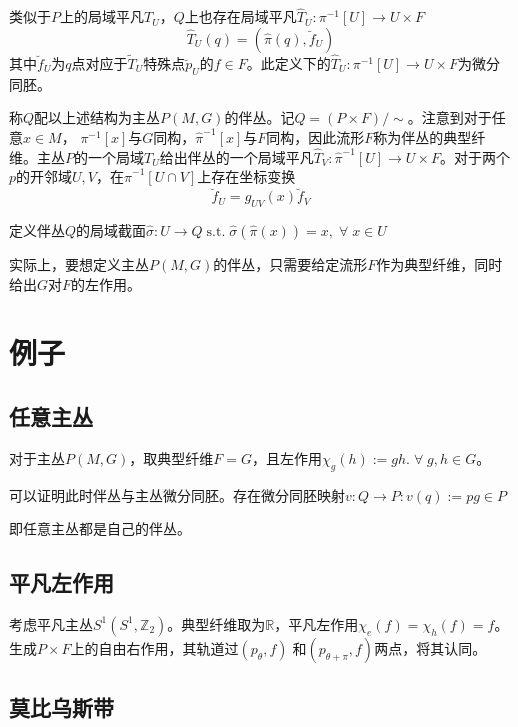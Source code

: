 \documentclass{ctexbook}
\begin{document}
类似于$P$上的局域平凡$T_U$，$Q$上也存在局域平凡$\hat{T}_U\colon\pi^{-1}[U]\to U\times F$
\begin{equation}
    \hat{T}_U(q)=(\hat{\pi}(q),\breve{f}_U)
\end{equation}
其中$\breve{f}_U$为$q$点对应于$\tilde{T}_U$特殊点$\breve{p}_U$的$f\in F$。此定义下的$\hat{T}_U\colon\pi^{-1}[U]\to U\times F$为微分同胚。

称$Q$配以上述结构为主丛$P(M,G)$的伴丛。记$Q=(P\times F)/ \sim$。注意到对于任意$x\in M$， $\pi^{-1}[x]$与$G$同构，$\hat{\pi}^{-1}[x]$与$F$同构，因此流形$F$称为伴丛的典型纤维。主丛$P$的一个局域$T_U$给出伴丛的一个局域平凡$\hat{T}_V\colon\hat{\pi}^{-1}[U]\to U\times F$。对于两个$p$的开邻域$U,V$，在$\hat{\pi}^{-1}[U\cap V]$上存在坐标变换
\begin{equation}
    \breve{f}_U=g_{UV}(x)\breve{f}_V
\end{equation}

定义伴丛$Q$的局域截面$\hat{\sigma}\colon U\to Q\;\text{s.t.}\;\hat{\sigma}(\hat{\pi}(x))=x,\;\forall\;x\in U$

实际上，要想定义主丛$P(M,G)$的伴丛，只需要给定流形$F$作为典型纤维，同时给出$G$对$F$的左作用。


\section{例子}

\subsection{任意主丛}
对于主丛$P(M,G)$，取典型纤维$F=G$，且左作用$\chi_g(h):=gh.\;\forall\;g,h\in G$。

可以证明此时伴丛与主丛微分同胚。存在微分同胚映射$v\colon Q\to P:v(q):=pg\in P$

即任意主丛都是自己的伴丛。

\subsection{平凡左作用}

考虑平凡主丛$S^1(S^1,\mathbb{Z}_2)$。典型纤维取为$\mathbb{R}$，平凡左作用$\chi_e(f)=\chi_h(f)=f$。生成$P\times F$上的自由右作用，其轨道过$(p_\theta,f)\;\text{和}(p_{\theta+\pi},f)$两点，将其认同。

\subsection{莫比乌斯带}
\end{document}
